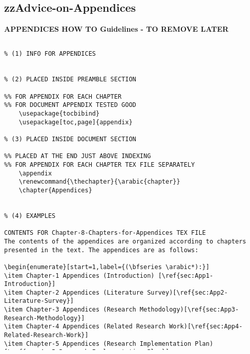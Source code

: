 \pagebreak
\begin{tcolorbox}

\section{zzAdvice-on-Appendices}

\textbf{APPENDICES HOW TO Guidelines - TO REMOVE LATER}	

\begin{lstlisting}[caption={zzAdvice-on-Appendices}, label=zzAdvice-on-Appendices]

% (1) INFO FOR APPENDICES


% (2) PLACED INSIDE PREAMBLE SECTION

%% FOR APPENDIX FOR EACH CHAPTER
%% FOR DOCUMENT APPENDIX TESTED GOOD
	\usepackage{tocbibind}
	\usepackage[toc,page]{appendix}

% (3) PLACED INSIDE DOCUMENT SECTION

%% PLACED AT THE END JUST ABOVE INDEXING
%% FOR APPENDIX FOR EACH CHAPTER TEX FILE SEPARATELY
	\appendix
	\renewcommand{\thechapter}{\arabic{chapter}}
	\chapter{Appendices}
	

% (4) EXAMPLES

CONTENTS FOR Chapter-8-Chapters-for-Appendices TEX FILE
The contents of the appendices are organized according to chapters presented in the text. The appendices are as follows: 

\begin{enumerate}[start=1,label={(\bfseries \arabic*):}]
\item Chapter-1 Appendices (Introduction) [\ref{sec:App1-Introduction}] 
\item Chapter-2 Appendices (Literature Survey)[\ref{sec:App2-Literature-Survey}] 
\item Chapter-3 Appendices (Research Methodology)[\ref{sec:App3-Research-Methodology}] 
\item Chapter-4 Appendices (Related Research Work)[\ref{sec:App4-Related-Research-Work}] 
\item Chapter-5 Appendices (Research Implementation Plan)[\ref{sec:App5-Research-Implementation-Plan}] 
\end{enumerate}


\end{lstlisting}
\end{tcolorbox}
